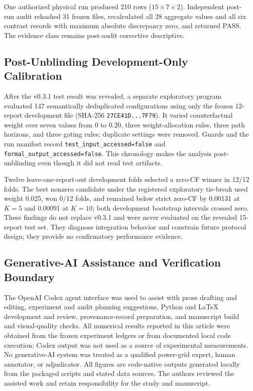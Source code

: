 \documentclass[applsci,article,submit,moreauthors]{Definitions/mdpi}
\begin{document}
One authorized physical run produced 210 rows ($15\times7\times2$). Independent post-run audit rehashed 31 frozen files, recalculated all 28 aggregate values and all six contrast records with maximum absolute discrepancy zero, and returned PASS. The evidence class remains post-audit corrective descriptive.

\subsection{Post-Unblinding Development-Only Calibration}

After the v0.3.1 test result was revealed, a separate exploratory program evaluated 147 semantically deduplicated configurations using only the frozen 12-report development file (SHA-256 \texttt{27CE41D...7F79}). It varied counterfactual weight over seven values from 0 to 0.20, three weight-allocation rules, three path horizons, and three gating rules; duplicate settings were removed. Guards and the run manifest record \texttt{test\_input\_accessed=false} and \texttt{formal\_output\_accessed=false}. This chronology makes the analysis post-unblinding even though it did not read test artifacts.

Twelve leave-one-report-out development folds selected a zero-CF winner in 12/12 folds. The best nonzero candidate under the registered exploratory tie-break used weight 0.025, won 0/12 folds, and remained below strict zero-CF by 0.00131 at $K=5$ and 0.00091 at $K=10$; both development bootstrap intervals crossed zero. These findings do not replace v0.3.1 and were never evaluated on the revealed 15-report test set. They diagnose integration behavior and constrain future protocol design; they provide no confirmatory performance evidence.

\subsection{Generative-AI Assistance and Verification Boundary}

The OpenAI Codex agent interface was used to assist with prose drafting and editing, experiment and audit planning suggestions, Python and \LaTeX{} development and review, provenance-record preparation, and manuscript build and visual-quality checks. All numerical results reported in this article were obtained from the frozen experiment ledgers or from documented local code execution; Codex output was not used as a source of experimental measurements. No generative-AI system was treated as a qualified power-grid expert, human annotator, or adjudicator. All figures are code-native outputs generated locally from the packaged scripts and stated data sources. The authors reviewed the assisted work and retain responsibility for the study and manuscript.
\end{document}
